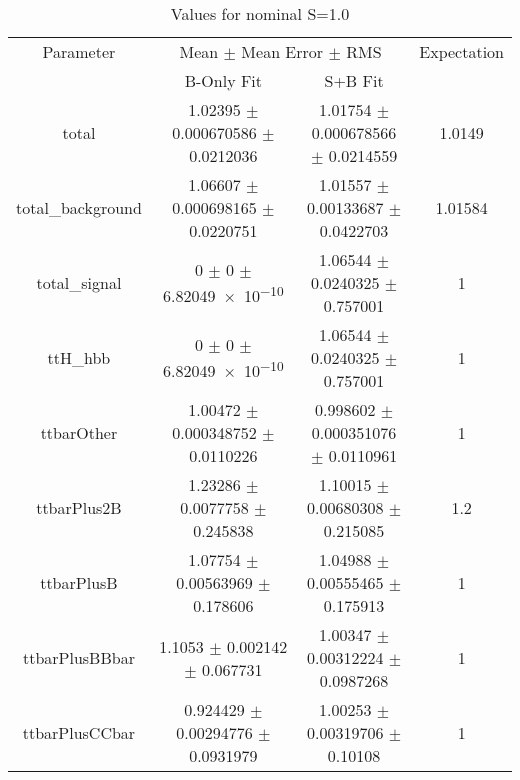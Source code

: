 \begin{table}
\centering
\caption{Values for nominal S=1.0}
\begin{tabular}{cccc}
\toprule
Parameter & \multicolumn{2}{c}{Mean $\pm$ Mean Error $\pm$ RMS} & Expectation\\
 & B-Only Fit & S+B Fit & \\
\midrule
total & \num{1.02395} $\pm$ \num{0.000670586} $\pm$ \num{0.0212036} & \num{1.01754} $\pm$ \num{0.000678566} $\pm$ \num{0.0214559} & \num{1.0149}\\
total\_background & \num{1.06607} $\pm$ \num{0.000698165} $\pm$ \num{0.0220751} & \num{1.01557} $\pm$ \num{0.00133687} $\pm$ \num{0.0422703} & \num{1.01584}\\
total\_signal & \num{0} $\pm$ \num{0} $\pm$ \num{6.82049e-10} & \num{1.06544} $\pm$ \num{0.0240325} $\pm$ \num{0.757001} & \num{1}\\
ttH\_hbb & \num{0} $\pm$ \num{0} $\pm$ \num{6.82049e-10} & \num{1.06544} $\pm$ \num{0.0240325} $\pm$ \num{0.757001} & \num{1}\\
ttbarOther & \num{1.00472} $\pm$ \num{0.000348752} $\pm$ \num{0.0110226} & \num{0.998602} $\pm$ \num{0.000351076} $\pm$ \num{0.0110961} & \num{1}\\
ttbarPlus2B & \num{1.23286} $\pm$ \num{0.0077758} $\pm$ \num{0.245838} & \num{1.10015} $\pm$ \num{0.00680308} $\pm$ \num{0.215085} & \num{1.2}\\
ttbarPlusB & \num{1.07754} $\pm$ \num{0.00563969} $\pm$ \num{0.178606} & \num{1.04988} $\pm$ \num{0.00555465} $\pm$ \num{0.175913} & \num{1}\\
ttbarPlusBBbar & \num{1.1053} $\pm$ \num{0.002142} $\pm$ \num{0.067731} & \num{1.00347} $\pm$ \num{0.00312224} $\pm$ \num{0.0987268} & \num{1}\\
ttbarPlusCCbar & \num{0.924429} $\pm$ \num{0.00294776} $\pm$ \num{0.0931979} & \num{1.00253} $\pm$ \num{0.00319706} $\pm$ \num{0.10108} & \num{1}\\
\bottomrule
\end{tabular}
\end{table}